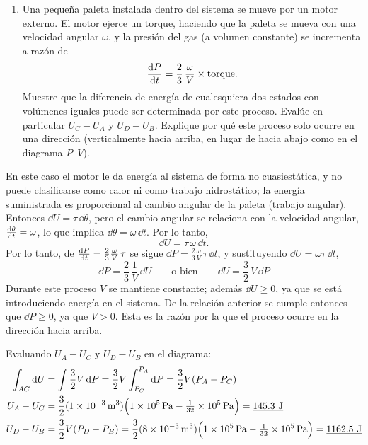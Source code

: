 \begin{ejemplo}
  \begin{enumerate}[label=\alph*),itemsep=2pt,resume]
    \item Una pequeña paleta instalada dentro del sistema se mueve por un motor externo. El motor
      ejerce un torque, haciendo que la paleta se mueva con una velocidad angular $\omega$, y la
      presión del gas (a volumen constante) se incrementa a razón de
      \begin{equation*}
        \dv{P}{t}=\frac{2}{3}\,\frac{\omega}{V}\times\text{torque}.
      \end{equation*}
      Muestre que la diferencia de energía de cualesquiera dos estados con volúmenes iguales puede
      ser determinada por este proceso. Evalúe en particular $U_C-U_A$ y $U_D-U_B$. Explique por
      qué este proceso solo ocurre en una dirección (verticalmente hacia arriba, en lugar de hacia
      abajo como en el diagrama $P$--$V$).
  \end{enumerate}

  \begin{solucion}
    En este caso el motor le da energía al sistema de forma no cuasiestática, y no puede
    clasificarse como calor ni como trabajo hidrostático; la energía suministrada es proporcional
    al cambio angular de la paleta (trabajo angular). Entonces $\dd U=\tau\,\dd\theta$, pero el
    cambio angular se relaciona con la velocidad angular, $\dv{\theta}{t}=\omega$, lo que implica
    $\dd\theta=\omega\,\dd t$. Por lo tanto,
    \begin{equation*}
      \dd U=\tau\,\omega\,\dd t.
    \end{equation*}
    Por lo tanto, de $\dv{P}{t}=\frac{2}{3}\frac{\omega}{V}\,\tau$ se sigue
    $\dd P=\frac{2}{3}\frac{\omega}{V}\,\tau\,\dd t$, y sustituyendo $\dd U=\omega\tau\,\dd t$,
    \begin{equation*}
      \dd P=\frac{2}{3}\,\frac{1}{V}\,\dd U
      \qquad\text{o bien}\qquad
      \boxed{\dd U=\frac{3}{2}\,V\,\dd P}
    \end{equation*}
    Durante este proceso $V$ se mantiene constante; además $\dd U\geq0$, ya que se está introduciendo
    energía en el sistema. De la relación anterior se cumple entonces que $\dd P\geq0$, ya que
    $V>0$. Esta es la razón por la que el proceso ocurre en la dirección hacia arriba.

    Evaluando $U_A-U_C$ y $U_D-U_B$ en el diagrama:
    \begin{align*}
      \int_{AC}\dd U&=\int\frac{3}{2}V\,\dd P=\frac{3}{2}V\int_{P_C}^{P_A}\dd P=\frac{3}{2}V(P_A-P_C)\\
      U_A-U_C&=\frac{3}{2}(1\times10^{-3}\,\mathrm{m^3})\Bigl(1\times10^{5}\,\mathrm{Pa}-\tfrac{1}{32}\times10^{5}\,\mathrm{Pa}\Bigr)
        =\underline{145.3\ \mathrm{J}}\\
      U_D-U_B&=\frac{3}{2}V(P_D-P_B)=\frac{3}{2}(8\times10^{-3}\,\mathrm{m^3})\Bigl(1\times10^{5}\,\mathrm{Pa}-\tfrac{1}{32}\times10^{5}\,\mathrm{Pa}\Bigr)
        =\underline{1162.5\ \mathrm{J}}
    \end{align*}
  \end{solucion}


\end{ejemplo}
